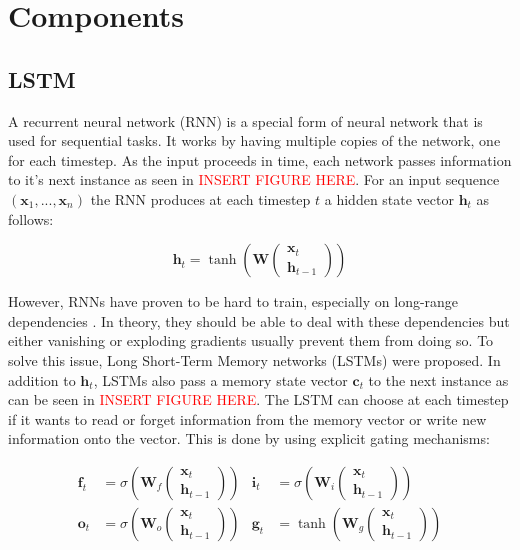 \section{Components}

\subsection{LSTM}

A recurrent neural network (RNN)\cite{rnn} is a special form of neural network that is used for sequential tasks. It works by having multiple copies of the network, one for each timestep. As the input proceeds in time, each network passes information to it's next instance as seen in  \textcolor{red}{INSERT FIGURE HERE}. For an input sequence \((\mathbf{x}_1, ..., \mathbf{x}_n)\) the RNN produces at each timestep \(t\) a hidden state vector \(\mathbf{h}_t\) as follows:

\begin{equation*}
  \mathbf{h}_t = \tanh \left(\mathbf{W} \begin{pmatrix} \mathbf{x}_t \\ \mathbf{h}_{t-1} \end{pmatrix} \right)
\end{equation*}

However, RNNs have proven to be hard to train, especially on long-range dependencies \cite{hochreiter_rnn}. In theory, they should be able to deal with these dependencies but either vanishing or exploding gradients usually prevent them from doing so. To solve this issue, Long Short-Term Memory networks (LSTMs) \cite{lstm} were proposed. In addition to \(\mathbf{h}_t\), LSTMs also pass a memory state vector \(\mathbf{c}_t\) to the next instance as can be seen in \textcolor{red}{INSERT FIGURE HERE}. The LSTM can choose at each timestep if it wants to read or forget information from the memory vector or write new information onto the vector. This is done by using explicit gating mechanisms:

\begin{align*}
  \mathbf{f}_t &= \sigma \left(\mathbf{W}_f \begin{pmatrix} \mathbf{x}_t \\ \mathbf{h}_{t-1} \end{pmatrix} \right) &
  \mathbf{i}_t &= \sigma \left(\mathbf{W}_i \begin{pmatrix} \mathbf{x}_t \\ \mathbf{h}_{t-1} \end{pmatrix} \right) \\
  \mathbf{o}_t &= \sigma \left(\mathbf{W}_o \begin{pmatrix} \mathbf{x}_t \\ \mathbf{h}_{t-1} \end{pmatrix} \right) &
  \mathbf{g}_t &= \tanh \left(\mathbf{W}_g \begin{pmatrix} \mathbf{x}_t \\ \mathbf{h}_{t-1} \end{pmatrix} \right)
\end{align*}

